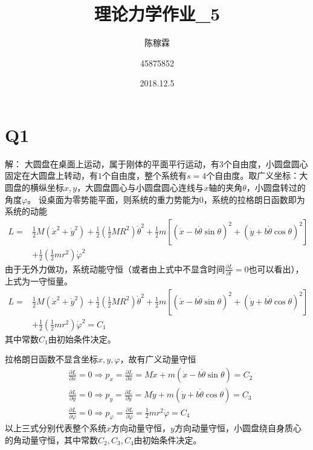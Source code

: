 \documentclass[10pt,a4paper]{article}
\title{理论力学作业\_5}
\author{陈稼霖 \and 45875852}
\date{2018.12.5}
\begin{document}
\maketitle
\section*{Q1}解：
大圆盘在桌面上运动，属于刚体的平面平行运动，有$3$个自由度，小圆盘圆心固定在大圆盘上转动，有$1$个自由度，整个系统有$s=4$个自由度。取广义坐标：大圆盘的横纵坐标$x,y$，大圆盘圆心与小圆盘圆心连线与$x$轴的夹角$\theta$，小圆盘转过的角度$\varphi$。 设桌面为零势能平面，则系统的重力势能为$0$，系统的拉格朗日函数即为系统的动能
\begin{align*}
L=&\frac{1}{2}M(\dot{x}^2+\dot{y}^2)+\frac{1}{2}(\frac{1}{2}MR^2)\dot{\theta}^2+\frac{1}{2}m[(\dot{x}-b\dot{\theta}\sin\theta)^2+(\dot{y}+b\dot{\theta}\cos\theta)^2]\\
&+\frac{1}{2}(\frac{1}{2}mr^2)\dot{\varphi}^2
\end{align*}
由于无外力做功，系统动能守恒（或者由上式中不显含时间$\frac{\partial L}{\partial t}=0$也可以看出），上式为一守恒量。
\begin{align*}
L=&\frac{1}{2}M(\dot{x}^2+\dot{y}^2)+\frac{1}{2}(\frac{1}{2}MR^2)\dot{\theta}^2+\frac{1}{2}m[(\dot{x}-b\dot{\theta}\sin\theta)^2+(\dot{y}+b\dot{\theta}\cos\theta)^2]\\
&+\frac{1}{2}(\frac{1}{2}mr^2)\dot{\varphi}^2=C_1
\end{align*}
其中常数$C_1$由初始条件决定。

\noindent 拉格朗日函数不显含坐标$x,y,\varphi$，故有广义动量守恒
\begin{align*}
&\frac{\partial L}{\partial x}=0\Longrightarrow p_x=\frac{\partial L}{\partial\dot{x}}=M\dot{x}+m(\dot{x}-b\dot{\theta}\sin\theta)=C_2\\
&\frac{\partial L}{\partial y}=0\Longrightarrow p_{y}=\frac{\partial L}{\partial\dot{y}}=M\dot{y}+m(\dot{y}+b\dot{\theta}\cos\theta)=C_3\\
&\frac{\partial L}{\partial\varphi}=0\Longrightarrow p_{\varphi}=\frac{\partial L}{\partial\dot{\varphi}}=\frac{1}{2}mr^2\dot{\varphi}=C_4
\end{align*}
以上三式分别代表整个系统$x$方向动量守恒，$y$方向动量守恒，小圆盘绕自身质心的角动量守恒，其中常数$C_2,C_3,C_4$由初始条件决定。
\end{document}
